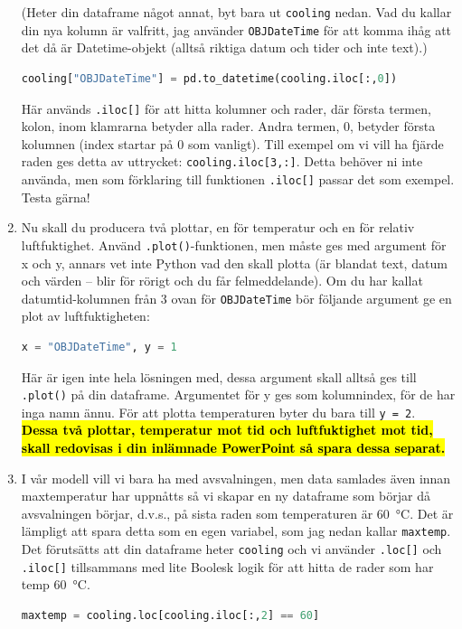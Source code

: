 \documentclass{article}
\begin{document}
\begin{enumerate}
    (Heter din dataframe något annat, byt bara ut \texttt{cooling} nedan. Vad du kallar din nya kolumn är valfritt, jag använder \texttt{OBJDateTime} för att komma ihåg att det då är Datetime-objekt (alltså riktiga datum och tider och inte text).)    
\begin{lstlisting}[language=Python]
cooling["OBJDateTime"] = pd.to_datetime(cooling.iloc[:,0])\end{lstlisting}
    Här används \texttt{.iloc[]} för att hitta kolumner och rader, där första termen, kolon, inom klamrarna betyder alla rader. Andra termen, 0, betyder första kolumnen (index startar på 0 som vanligt). Till exempel om vi vill ha fjärde raden ges detta av uttrycket: \texttt{cooling.iloc[3,:]}.   Detta behöver ni inte använda, men som förklaring till funktionen \texttt{.iloc[]} passar det som exempel. Testa gärna!
    \item Nu skall du producera två plottar, en för temperatur och en för relativ luftfuktighet. Använd \texttt{.plot()}-funktionen, men måste ges med argument för x och y, annars vet inte Python vad den skall plotta (är blandat text, datum och värden – blir för rörigt och du får felmeddelande). Om du har kallat datumtid-kolumnen från 3 ovan för \texttt{OBJDateTime} bör följande argument ge en plot av luftfuktigheten:
    \begin{lstlisting}[language=Python]
x = "OBJDateTime", y = 1
\end{lstlisting}
    Här är igen inte hela lösningen med, dessa argument skall alltså ges till \texttt{.plot()} på din dataframe. Argumentet för y ges som kolumnindex, för de har inga namn ännu. För att plotta temperaturen byter du bara till \texttt{y = 2}. \hl{\textbf{Dessa två plottar, temperatur mot tid och luftfuktighet mot tid, skall redovisas i din inlämnade PowerPoint så spara dessa separat.}}
    \item I vår modell vill vi bara ha med avsvalningen, men data samlades även innan maxtemperatur har uppnåtts så vi skapar en ny dataframe som börjar då avsvalningen börjar, d.v.s., på sista raden som temperaturen är \SI{60}{\celsius}. Det är lämpligt att spara detta som en egen variabel, som jag nedan kallar \texttt{maxtemp}. Det förutsätts att din dataframe heter \texttt{cooling} och vi använder \texttt{.loc[]} och \texttt{.iloc[]} tillsammans med lite Boolesk logik för att hitta de rader som har temp \qty{60}{\celsius}.
    \begin{lstlisting}[language=Python]
maxtemp = cooling.loc[cooling.iloc[:,2] == 60]
\end{lstlisting}

\end{enumerate}
\end{document}
